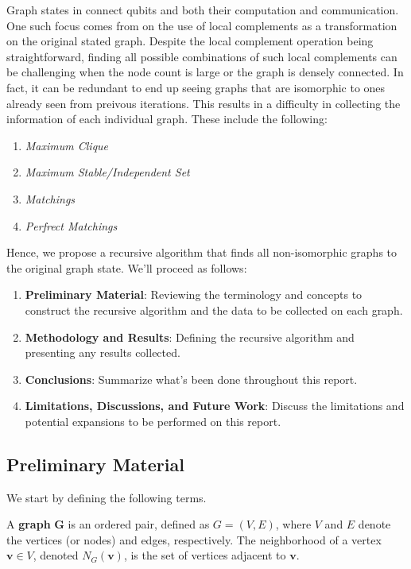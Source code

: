 \documentclass[12pt]{report} %
\begin{document}
Graph states in \cite{Vesperini_2024} connect qubits and both their computation and communication. One such focus comes from \cite{Adcock_2020} on the use of local complements as a transformation on the original stated graph. Despite the local complement operation being straightforward,
finding all possible combinations of such local complements can be challenging when the node count is large or the graph is densely connected. In fact, it can be redundant to end up seeing graphs that are isomorphic to ones already seen from preivous iterations. This results in a difficulty in collecting 
the information of each individual graph. These include the following: 
\begin{enumerate}[label=(\roman*), font=\itshape]
    \item \emph{Maximum Clique}
    \item \emph{Maximum Stable/Independent Set}
    \item \emph{Matchings}
    \item \emph{Perfrect Matchings}
\end{enumerate}

Hence, we propose a recursive algorithm that finds all non-isomorphic graphs to the original graph state. We'll proceed as follows: 
\begin{enumerate}[label=(\roman*), font=\itshape]
    \item \textbf{Preliminary Material}: Reviewing the terminology and concepts to construct the recursive algorithm and the data to be collected on each graph. 
    \item \textbf{Methodology and Results}: Defining the recursive algorithm and presenting any results collected.  
    \item \textbf{Conclusions}: Summarize what's been done throughout this report. 
    \item \textbf{Limitations, Discussions, and Future Work}: Discuss the limitations and potential expansions to be performed on this report. 
\end{enumerate}

\subsection*{Preliminary Material}

We start by defining the following terms. 

\begin{tcolorbox}[colback=orange!10!white, colframe=orange!75!black, title=\textbf{Definition}]
    A \textbf{graph} $\mathbf{G}$ is an ordered pair, defined as $G = (V, E)$, where $V$ and $E$ denote the vertices (or nodes) and edges, respectively. The neighborhood
    of a vertex $\mathbf{v} \in V$, denoted $N_{G}(\mathbf{v})$, is the set of vertices adjacent to $\mathbf{v}$. 
\end{tcolorbox}
\end{document}
